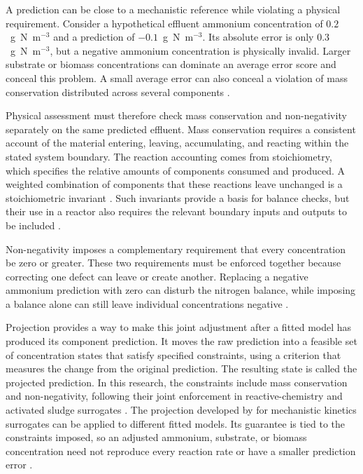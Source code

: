 A prediction can be close to a mechanistic reference while violating a physical requirement. Consider a hypothetical effluent ammonium concentration of $0.2$~g~N~m$^{-3}$ and a prediction of $-0.1$~g~N~m$^{-3}$. Its absolute error is only $0.3$~g~N~m$^{-3}$, but a negative ammonium concentration is physically invalid. Larger substrate or biomass concentrations can dominate an average error score and conceal this problem. A small average error can also conceal a violation of mass conservation distributed across several components \citep{Hansen2024,KircherVotsmeier2025}.

Physical assessment must therefore check mass conservation and non-negativity separately on the same predicted effluent. Mass conservation requires a consistent account of the material entering, leaving, accumulating, and reacting within the stated system boundary. The reaction accounting comes from stoichiometry, which specifies the relative amounts of components consumed and produced. A weighted combination of components that these reactions leave unchanged is a stoichiometric invariant \citep{Henze2006,SturmWexler2020,SturmWexler2022}. Such invariants provide a basis for balance checks, but their use in a reactor also requires the relevant boundary inputs and outputs to be included \citep{TakacsVanrolleghem2006}.

Non-negativity imposes a complementary requirement that every concentration be zero or greater. These two requirements must be enforced together because correcting one defect can leave or create another. Replacing a negative ammonium prediction with zero can disturb the nitrogen balance, while imposing a balance alone can still leave individual concentrations negative \citep{Harder2022,KircherVotsmeier2025}.

Projection provides a way to make this joint adjustment after a fitted model has produced its component prediction. It moves the raw prediction into a feasible set of concentration states that satisfy specified constraints, using a criterion that measures the change from the original prediction. The resulting state is called the projected prediction. In this research, the constraints include mass conservation and non-negativity, following their joint enforcement in reactive-chemistry and activated sludge surrogates \citep{KircherVotsmeier2025,Selerio2026}. The projection developed by \citet{KircherVotsmeier2025} for mechanistic kinetics surrogates can be applied to different fitted models. Its guarantee is tied to the constraints imposed, so an adjusted ammonium, substrate, or biomass concentration need not reproduce every reaction rate or have a smaller prediction error \citep{SturmSilva2024,Selerio2026}.

